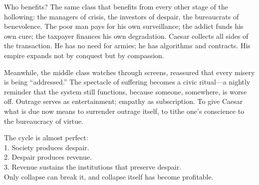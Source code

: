 \documentclass[11pt,twoside]{book}
\begin{document}
Who benefits?  The same class that benefits from every other stage of the hollowing:  
the managers of crisis, the investors of despair, the bureaucrats of benevolence.  
The poor man pays for his own surveillance; the addict funds his own cure; the taxpayer finances his own degradation.  
Caesar collects all sides of the transaction.  
He has no need for armies; he has algorithms and contracts.  
His empire expands not by conquest but by compassion.  

Meanwhile, the middle class watches through screens, reassured that every misery is being “addressed.”  
The spectacle of suffering becomes a civic ritual—a nightly reminder that the system still functions, because someone, somewhere, is worse off.  
Outrage serves as entertainment; empathy as subscription.  
To give Caesar what is due now means to surrender outrage itself, to tithe one’s conscience to the bureaucracy of virtue.

The cycle is almost perfect: \\ 
1. Society produces despair. \\ 
2. Despair produces revenue. \\ 
3. Revenue sustains the institutions that preserve despair. \\ 
Only collapse can break it, and collapse itself has become profitable.
\end{document}
